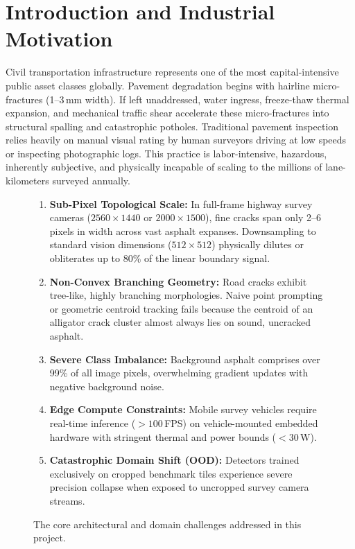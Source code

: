 \documentclass[11pt,a4paper]{article}
\begin{document}
\section{Introduction and Industrial Motivation}
\label{sec:intro}

Civil transportation infrastructure represents one of the most capital-intensive public asset classes globally. 
Pavement degradation begins with hairline micro-fractures (1--3\,mm width). If left unaddressed, water ingress, freeze-thaw thermal expansion, and mechanical traffic shear accelerate these micro-fractures into structural spalling and catastrophic potholes. 
Traditional pavement inspection relies heavily on manual visual rating by human surveyors driving at low speeds or inspecting photographic logs. 
This practice is labor-intensive, hazardous, inherently subjective, and physically incapable of scaling to the millions of lane-kilometers surveyed annually.

\begin{figure}[H]
\centering
\begin{tcolorbox}[colback=boxbg,colframe=boxframe,arc=2mm,title=\textbf{The CrackDistill Industrial Dilemma}]
\begin{enumerate}[leftmargin=1.5em,itemsep=2pt]
  \item \textbf{Sub-Pixel Topological Scale:} In full-frame highway survey cameras ($2560\times1440$ or $2000\times1500$), fine cracks span only 2--6 pixels in width across vast asphalt expanses. Downsampling to standard vision dimensions ($512\times512$) physically dilutes or obliterates up to 80\% of the linear boundary signal.
  \item \textbf{Non-Convex Branching Geometry:} Road cracks exhibit tree-like, highly branching morphologies. Naive point prompting or geometric centroid tracking fails because the centroid of an alligator crack cluster almost always lies on sound, uncracked asphalt.
  \item \textbf{Severe Class Imbalance:} Background asphalt comprises over 99\% of all image pixels, overwhelming gradient updates with negative background noise.
  \item \textbf{Edge Compute Constraints:} Mobile survey vehicles require real-time inference ($>100$\,FPS) on vehicle-mounted embedded hardware with stringent thermal and power bounds ($<30$\,W).
  \item \textbf{Catastrophic Domain Shift (OOD):} Detectors trained exclusively on cropped benchmark tiles experience severe precision collapse when exposed to uncropped survey camera streams.
\end{enumerate}
\end{tcolorbox}
\caption{The core architectural and domain challenges addressed in this project.}
\label{fig:dilemma}
\end{figure}
\end{document}
